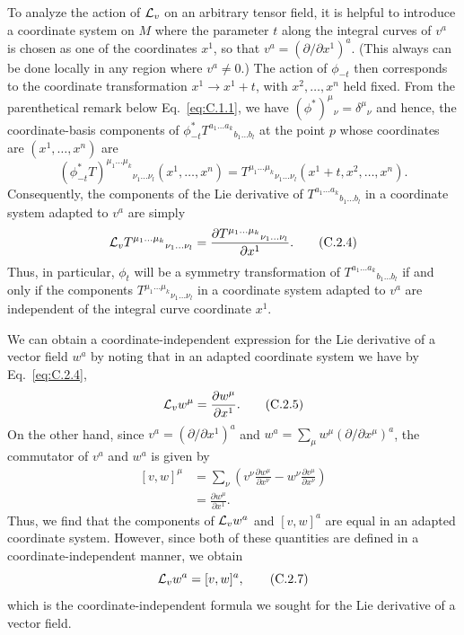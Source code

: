 To analyze the action of \(\mathcal{L}_v\) on an arbitrary tensor field, it is helpful to
introduce a coordinate system on \(M\) where the parameter \(t\) along the integral
curves of \(v^a\) is chosen as one of the coordinates \(x^1\), so that
\(v^a=(\partial/\partial x^1)^a\). (This always can be done locally in any region
where \(v^a\ne0\).) The action of \(\phi_{-t}\) then corresponds to the coordinate
transformation \(x^1\to x^1+t\), with \(x^2,\ldots,x^n\) held fixed. From the
parenthetical remark below Eq.~\eqref{eq:C.1.1}, we have
\((\phi^*)^\mu{}_\nu=\delta^\mu{}_\nu\) and hence, the coordinate-basis components
of \(\phi_{-t}^*T^{a_1\ldots a_k}{}_{b_1\ldots b_l}\) at the point \(p\) whose
coordinates are \((x^1,\ldots,x^n)\) are
\begin{equation}
  (\phi_{-t}^*T)^{\mu_1\ldots\mu_k}{}_{\nu_1\ldots\nu_l}
  (x^1,\ldots,x^n)
  =T^{\mu_1\ldots\mu_k}{}_{\nu_1\ldots\nu_l}
  (x^1+t,x^2,\ldots,x^n).
  \tag{C.2.3}\label{eq:C.2.3}
\end{equation}
Consequently, the components of the Lie derivative of
\(T^{a_1\ldots a_k}{}_{b_1\ldots b_l}\) in a coordinate system adapted to \(v^a\)
are simply
\begin{equation}
  \mathcal{L}_vT^{\mu_1\ldots\mu_k}{}_{\nu_1\ldots\nu_l}
  =\frac{\partial T^{\mu_1\ldots\mu_k}{}_{\nu_1\ldots\nu_l}}{\partial x^1}.
  \tag{C.2.4}\label{eq:C.2.4}
\end{equation}
Thus, in particular, \(\phi_t\) will be a symmetry transformation of
\(T^{a_1\ldots a_k}{}_{b_1\ldots b_l}\) if and only if the components
\(T^{\mu_1\ldots\mu_k}{}_{\nu_1\ldots\nu_l}\) in a coordinate system adapted to
\(v^a\) are independent of the integral curve coordinate \(x^1\).

We can obtain a coordinate-independent expression for the Lie derivative of a vector
field \(w^a\) by noting that in an adapted coordinate system we have by
Eq.~\eqref{eq:C.2.4},
\begin{equation}
  \mathcal{L}_vw^\mu=\frac{\partial w^\mu}{\partial x^1}.
  \tag{C.2.5}\label{eq:C.2.5}
\end{equation}
On the other hand, since \(v^a=(\partial/\partial x^1)^a\) and
\(w^a=\sum_\mu w^\mu(\partial/\partial x^\mu)^a\), the commutator of \(v^a\) and
\(w^a\) is given by
\begin{equation}
\begin{aligned}
  [v,w]^\mu
  &=\sum_\nu\left(
    v^\nu\frac{\partial w^\mu}{\partial x^\nu}
    -w^\nu\frac{\partial v^\mu}{\partial x^\nu}
  \right) \\
  &=\frac{\partial w^\mu}{\partial x^1}.
\end{aligned}
  \tag{C.2.6}\label{eq:C.2.6}
\end{equation}
Thus, we find that the components of \(\mathcal{L}_vw^a\) and \([v,w]^a\) are equal in an
adapted coordinate system. However, since both of these quantities are defined in a
coordinate-independent manner, we obtain
\begin{equation}
  \mathcal{L}_vw^a=[v,w]^a,
  \tag{C.2.7}\label{eq:C.2.7}
\end{equation}
which is the coordinate-independent formula we sought for the Lie derivative of a
vector field.


